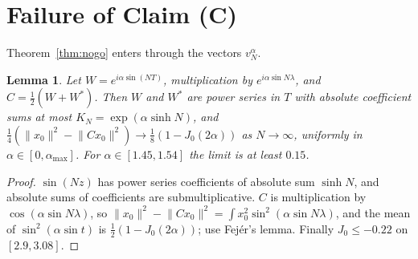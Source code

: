 \documentclass[11pt]{article}
\newtheorem{lemma}[theorem]{Lemma}
\theoremstyle{definition}
\newcommand{\norm}[1]{\lVert #1\rVert}
\begin{document}
\section{Failure of Claim (C)}

Theorem~\ref{thm:nogo} enters through the vectors $v_N^\alpha$.

\begin{lemma}\label{lem:osc}
Let $W=e^{i\alpha\sin(NT)}$, multiplication by $e^{i\alpha\sin N\lambda}$, and
$C=\frac12(W+W^*)$. Then $W$ and $W^*$ are power series in $T$ with absolute coefficient sums
at most $K_N=\exp(\alpha\sinh N)$, and
$\frac14(\norm{x_0}^2-\norm{Cx_0}^2)\to\frac18(1-J_0(2\alpha))$ as $N\to\infty$, uniformly in
$\alpha\in[0,\alpha_{\max}]$. For $\alpha\in[1.45,1.54]$ the limit is at least $0.15$.
\end{lemma}
\begin{proof}
$\sin(Nz)$ has power series coefficients of absolute sum $\sinh N$, and absolute sums of
coefficients are submultiplicative. $C$ is multiplication by $\cos(\alpha\sin N\lambda)$, so
$\norm{x_0}^2-\norm{Cx_0}^2=\int x_0^2\sin^2(\alpha\sin N\lambda)$, and the mean of
$\sin^2(\alpha\sin t)$ is $\frac12(1-J_0(2\alpha))$; use Fej\'er's lemma. Finally
$J_0\le-0.22$ on $[2.9,3.08]$.
\end{proof}
\end{document}
